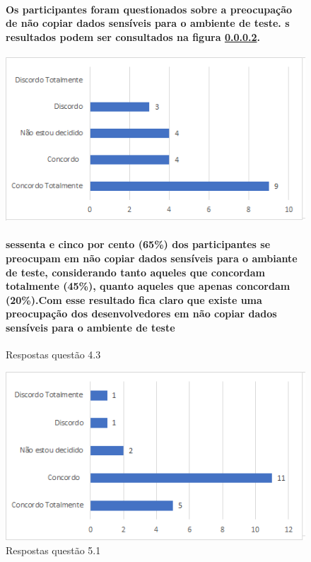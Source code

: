 \begin{figure}[!t]
\centering
\paragraph{Os participantes foram questionados sobre a preocupação de não copiar dados sensíveis para o ambiente de teste. s resultados podem ser consultados na figura \ref{fig:4.3}.}

\includegraphics[scale=0.7]{figuras das questoes/4.3.png}
\caption{Respostas questão 4.3}
\paragraph{sessenta e cinco por cento (65{\%}) dos participantes se preocupam em não copiar dados sensíveis para o ambiante de teste, considerando tanto aqueles que concordam totalmente (45{\%}), quanto aqueles que apenas concordam (20{\%}).Com esse resultado fica claro que existe uma preocupação dos desenvolvedores em não copiar dados sensíveis para o ambiente de teste} 

\label{fig:4.3}
\end{figure}
\begin{figure}[!t]
\centering
\includegraphics[scale=0.7]{figuras das questoes/5.1.png}
\caption{Respostas questão 5.1}
\end{figure}

